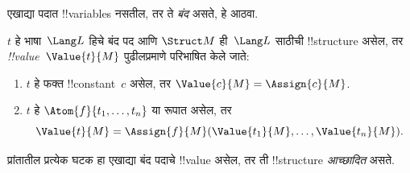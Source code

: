 \documentclass[../../../include/open-logic-section]{subfiles}
\begin{document}


\begin{explain}
एखाद्या पदात !!{variable}s नसतील, तर ते \emph{बंद} असते, हे आठवा.
\end{explain}

\begin{defn}[बंद पदांचे !!^{value}]
$t$ हे भाषा~$\Lang L$ हिचे बंद पद आणि $\Struct M$ ही~$\Lang L$ साठीची
!!{structure} असेल, तर \emph{!!{value}}~$\Value{t}{M}$ पुढीलप्रमाणे
परिभाषित केले जाते:
\begin{enumerate}
\item $t$ हे फक्त !!{constant}~$c$ असेल, तर
  $\Value{c}{M} = \Assign{c}{M}$.
\item $t$ हे $\Atom{f}{t_1, \ldots, t_n}$ या रूपात असेल, तर
  \[
  \Value{t}{M} = \Assign{f}{M}(\Value{t_1}{M}, \ldots,
  \Value{t_n}{M}).
  \]
\end{enumerate}
\end{defn}

\begin{defn}[आच्छादित !!{structure}]
प्रांतातील प्रत्येक घटक हा एखाद्या बंद पदाचे !!{value} असेल, तर ती
!!{structure} \emph{आच्छादित} असते.
\end{defn}
\end{document}

